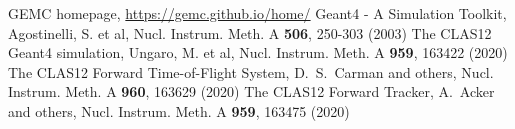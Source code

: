 %
% 
%
%
\begin{thebibliography}{}
%
%
GEMC homepage, \url{https://gemc.github.io/home/}
%
Geant4 - A Simulation Toolkit, Agostinelli, S. et al, Nucl. Instrum. Meth. A \textbf{506}, 250-303 (2003)
%
The CLAS12 Geant4 simulation, Ungaro, M. et al, Nucl. Instrum. Meth. A \textbf{959}, 163422 (2020)
%
The CLAS12 Forward Time-of-Flight System, D.~S.~Carman and others, Nucl. Instrum. Meth. A \textbf{960}, 163629 (2020)
%
The CLAS12 Forward Tracker, A.~Acker and others, Nucl. Instrum. Meth. A \textbf{959}, 163475 (2020)

\end{thebibliography}


